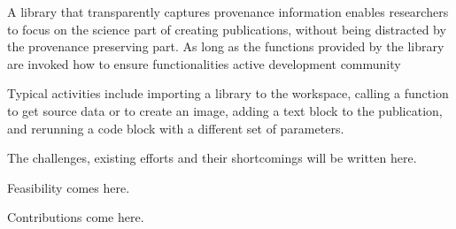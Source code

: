 A library that transparently captures provenance information enables researchers to focus on the science part of creating publications, without being distracted by the provenance preserving part. As long as the functions provided by the library are invoked how to ensure functionalities active development community

Typical activities include importing a library to the workspace, calling a function to get source data or to create an image, adding a text block to the publication, and rerunning a code block with a different set of parameters.

The challenges, existing efforts and their shortcomings will be written here.

Feasibility comes here.

Contributions come here.
